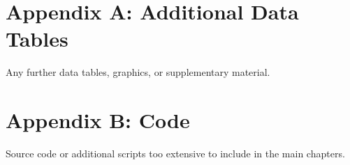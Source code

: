 \documentclass[a4paper,12pt]{report}
\begin{document}
\appendix

\chapter{Appendix A: Additional Data Tables}
Any further data tables, graphics, or supplementary material.

\chapter{Appendix B: Code}
Source code or additional scripts too extensive to include in the main chapters.
\end{document}

